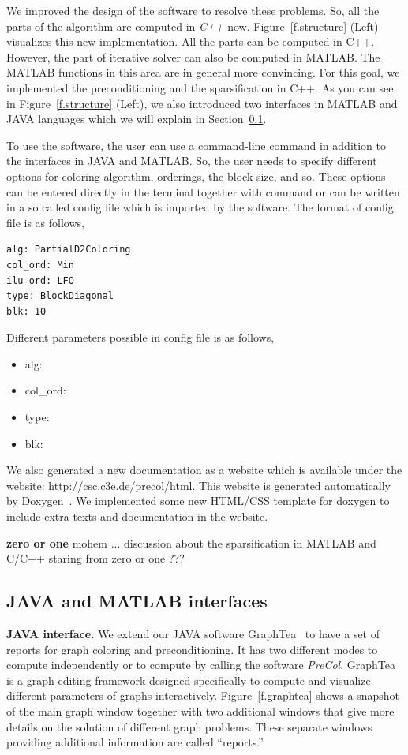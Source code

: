 \documentclass[12pt, twoside]{book}
\newcommand{\todo}[1]{\textbf{#1}}
\begin{document}
We improved the design of the software to resolve these problems.
So, all the parts of the algorithm are computed in \textit{C++} now.
Figure~\ref{f.structure} (Left) visualizes this new implementation.
All the parts can be computed in C++. However,
the part of iterative solver can also be computed in MATLAB.
The MATLAB functions in this area are in general more convincing.
For this goal, we implemented the preconditioning and the sparsification in C++.
As you can see in Figure~\ref{f.structure} (Left), we also introduced
two interfaces in MATLAB and JAVA languages which we will explain in
Section~\ref{s.interfaces}.

To use the software, the user can use a command-line command in addition to
the interfaces in JAVA and MATLAB. So, the user needs to specify different
options for coloring algorithm, orderings, the block size, and so.
These options can be entered directly in the terminal together with command
or can be written in a so called config file which is imported by the software.
The format of config file is as follows,
\begin{lstlisting}
alg: PartialD2Coloring
col_ord: Min
ilu_ord: LFO
type: BlockDiagonal
blk: 10
\end{lstlisting}
Different parameters possible in config file is as follows,
\begin{itemize}
\item alg:
\item col\_ord:
\item type:
\item blk:
\end{itemize}

We also generated a new documentation as a website which is available
under the website: http://csc.c3e.de/precol/html.
This website is generated automatically by Doxygen~\cite{Lischner2013}.
We implemented some new HTML/CSS template for doxygen to include extra
texts and documentation in the website.

\todo{zero or one}
mohem ... discussion about the sparsification in MATLAB and C/C++
staring from zero or one ???


\subsection{JAVA and MATLAB interfaces}
\label{s.interfaces}
\textbf{JAVA interface.}
We extend our JAVA software GraphTea~
\cite{2014:07,2014:15,2014:16,2015:05,2015:06,2015:07,2015:08} to have a
set of reports for graph coloring and preconditioning. It has two different modes
to compute independently or to compute by calling the software \textit{PreCol}.
GraphTea is a graph editing framework designed specifically to compute and visualize
different parameters of graphs interactively.
Figure~\ref{f.graphtea} shows a snapshot of the main
graph window together with two additional windows that give more details on the solution
of different graph problems. These separate windows providing additional information are
called ``reports.''
\end{document}

